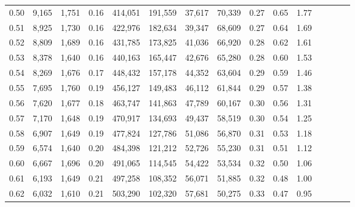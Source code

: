 \begin{tabular}{rrrcrrrrrrrrrrr}
0.50 &   9,165 &  1,751 &                                       0.16 &  414,051 &  191,559 &   37,617 &   70,339 &  0.27 &  0.65 &                         1.77 \\
0.51 &   8,925 &  1,730 &                                       0.16 &  422,976 &  182,634 &   39,347 &   68,609 &  0.27 &  0.64 &                         1.69 \\
0.52 &   8,809 &  1,689 &                                       0.16 &  431,785 &  173,825 &   41,036 &   66,920 &  0.28 &  0.62 &                         1.61 \\
0.53 &   8,378 &  1,640 &                                       0.16 &  440,163 &  165,447 &   42,676 &   65,280 &  0.28 &  0.60 &                         1.53 \\
0.54 &   8,269 &  1,676 &                                       0.17 &  448,432 &  157,178 &   44,352 &   63,604 &  0.29 &  0.59 &                         1.46 \\
0.55 &   7,695 &  1,760 &                                       0.19 &  456,127 &  149,483 &   46,112 &   61,844 &  0.29 &  0.57 &                         1.38 \\
0.56 &   7,620 &  1,677 &                                       0.18 &  463,747 &  141,863 &   47,789 &   60,167 &  0.30 &  0.56 &                         1.31 \\
0.57 &   7,170 &  1,648 &                                       0.19 &  470,917 &  134,693 &   49,437 &   58,519 &  0.30 &  0.54 &                         1.25 \\
0.58 &   6,907 &  1,649 &                                       0.19 &  477,824 &  127,786 &   51,086 &   56,870 &  0.31 &  0.53 &                         1.18 \\
0.59 &   6,574 &  1,640 &                                       0.20 &  484,398 &  121,212 &   52,726 &   55,230 &  0.31 &  0.51 &                         1.12 \\
0.60 &   6,667 &  1,696 &                                       0.20 &  491,065 &  114,545 &   54,422 &   53,534 &  0.32 &  0.50 &                         1.06 \\
0.61 &   6,193 &  1,649 &                                       0.21 &  497,258 &  108,352 &   56,071 &   51,885 &  0.32 &  0.48 &                         1.00 \\
0.62 &   6,032 &  1,610 &                                       0.21 &  503,290 &  102,320 &   57,681 &   50,275 &  0.33 &  0.47 &                         0.95 \\

\end{tabular}
